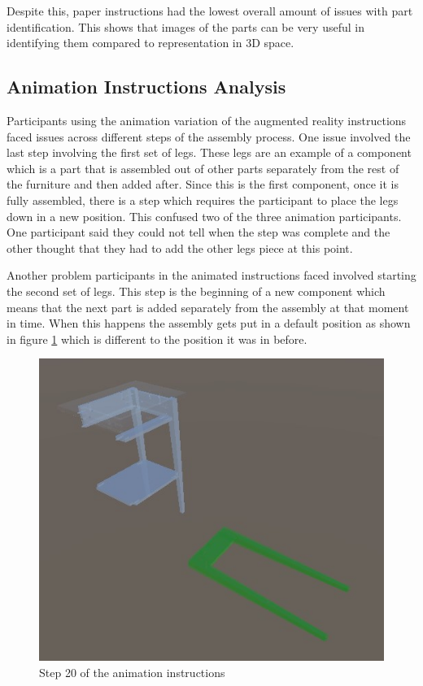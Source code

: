 \documentclass{l4proj}
\begin{document}
Despite this, paper instructions had the lowest overall amount of issues with part identification. This shows that images of the parts can be very useful in identifying them compared to representation in 3D space. 

\subsection{Animation Instructions Analysis}

Participants using the animation variation of the augmented reality instructions faced issues across different steps of the assembly process. One issue involved the last step involving the first set of legs. These legs are an example of a component which is a part that is assembled out of other parts separately from the rest of the furniture and then added after. Since this is the first component, once it is fully assembled, there is a step which requires the participant to place the legs down in a new position. This confused two of the three animation participants. One participant said they could not tell when the step was complete and the other thought that they had to add the other legs piece at this point.

Another problem participants in the animated instructions faced involved starting the second set of legs. This step is the beginning of a new component which means that the next part is added separately from the assembly at that moment in time. When this happens the assembly gets put in a default position as shown in figure \ref{fig:anim20} which is different to the position it was in before.

\begin{figure}[hbt!]
    \centering
    \includegraphics[width=0.5\linewidth]{dissertation//images/animationLegsLeft.jpg}
    \caption{Step 20 of the animation instructions}
    \label{fig:anim20}
\end{figure}
\end{document}
